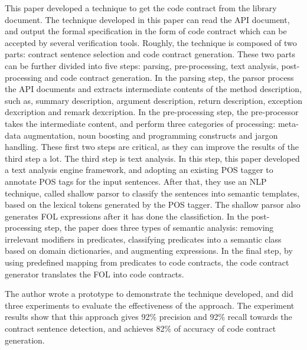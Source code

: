 \documentclass[11pt,letterpaper,oneside]{article}
\begin{document}
This paper developed a technique to get the code contract from the library document.
The technique developed in this paper can read the API document,
and output the formal specification in the form of code contract which can be accepted by several verification tools.
Roughly, the technique is composed of two parts: contract sentence selection and code contract generation.
These two parts can be further divided into five steps: parsing, pre-processing, text analysis, post-processing and code contract generation.
In the parsing step, the parsor process the API documents and extracts intermediate contents of the method description, 
such as, summary description, argument description, return description, exception dexcription and remark dexcription. 
In the pre-processing step, the pre-processor takes the intermediate content, 
and perform three categories of processing: meta-data augmentation, noun boosting and programming constructs and jargon handling.
These first two steps are critical, as they can improve the results of the third step a lot.
The third step is text analysis.
In this step, this paper developed a text analysis engine framework, 
and adopting an existing POS tagger to annotate POS tags for the input sentences.
After that, they use an NLP technique, called shallow parsor to classify the sentences into semantic templates,
based on the lexical tokens generated by the POS tagger.
The shallow parsor also generates FOL expressions after it has done the classifiction.
In the post-processing step, the paper does three types of semantic analysis: removing irrelevant modifiers in predicates, classifying predicates into a semantic class based on domain dictionaries, and augmenting expressions.
In the final step, by using predefined mapping from predicates to code contracts,
the code contract generator translates the FOL into code contracts.

The author wrote a prototype to demonstrate the technique developed,
and did three experiments to evaluate the effectiveness of the approach. 
The experiment results show that this approach gives 92\% precision and 92\% recall towards the contract sentence detection,
and achieves 82\% of accuracy of code contract generation.



\end{document}
